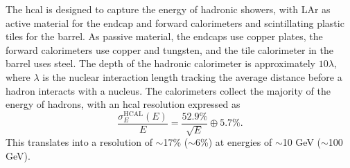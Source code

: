 The \gls{hcal} is designed to capture the energy of hadronic showers, with LAr as active material for the endcap and forward calorimeters and scintillating plastic tiles for the barrel. As passive material, the endcaps use copper plates, the forward calorimeters use copper and tungsten, and the tile calorimeter in the barrel uses steel. The depth of the hadronic calorimeter is approximately $10 \lambda$, where $\lambda$ is the nuclear interaction length tracking the average distance before a hadron interacts with a nucleus. The calorimeters collect the majority of the energy of hadrons, with an \gls{hcal} resolution expressed as \cite{Cavallari_2011}
\begin{equation}
  \frac{\sigma_E^{\text{HCAL}}(E)}{E} = \frac{52.9\%}{\sqrt{E}} \oplus 5.7\%.
\end{equation}
This translates into a resolution of $\sim$17\% ($\sim$6\%) at energies of $\sim$10 GeV ($\sim$100 GeV).

